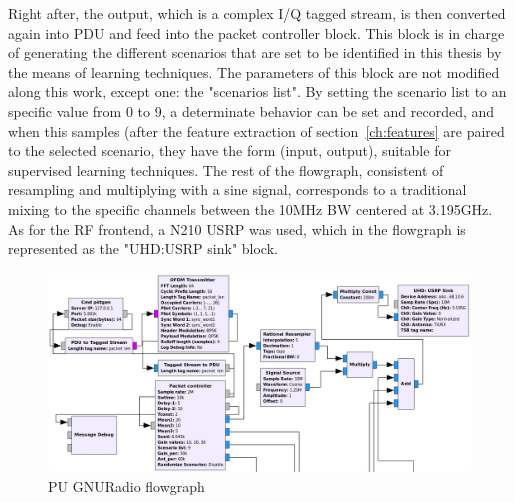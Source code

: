 Right after, the output, which is a complex I/Q tagged stream, is then converted again into \ac{PDU} and feed into the packet controller block. This block is in charge of generating the different scenarios that are set to be identified in this thesis by the means of learning techniques. The parameters of this block are not modified along this work, except one: the "scenarios list". By setting the scenario list to an specific value from 0 to 9, a determinate behavior can be set and recorded, and when this samples (after the feature extraction of section~\ref{ch:features} are paired to the selected scenario, they have the form (input, output), suitable for supervised learning techniques. The rest of the flowgraph, consistent of resampling and multiplying with a sine signal, corresponds to a traditional mixing to the specific channels between the 10MHz \ac{BW} centered at 3.195GHz. As for the \ac{RF} frontend, a N210 \ac{USRP} was used, which in the flowgraph is represented as the "UHD:USRP sink" block.

\begin{figure}[!htb]
    \centering
    \includegraphics[width=\textwidth]{figures/PU_flowgraph}
    \caption{\ac{PU} GNURadio flowgraph}
    \label{fig:PU_flowgraph}
\end{figure}


